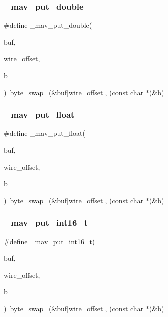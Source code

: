 \mbox{\label{protocol_8h_ab99f10b1bf768f4122b1caa067d24ba8}} 
\subsubsection{\+\_\+mav\+\_\+put\+\_\+double}
{\footnotesize\ttfamily \#define \+\_\+mav\+\_\+put\+\_\+double(\begin{DoxyParamCaption}\item[{}]{buf,  }\item[{}]{wire\+\_\+offset,  }\item[{}]{b }\end{DoxyParamCaption})~byte\+\_\+swap\+\_(\&buf[wire\+\_\+offset], (const char $\ast$)\&b)}

\mbox{\label{protocol_8h_a7dc7a1d53caa88eafeb412ae3dfe7e48}} 
\subsubsection{\+\_\+mav\+\_\+put\+\_\+float}
{\footnotesize\ttfamily \#define \+\_\+mav\+\_\+put\+\_\+float(\begin{DoxyParamCaption}\item[{}]{buf,  }\item[{}]{wire\+\_\+offset,  }\item[{}]{b }\end{DoxyParamCaption})~byte\+\_\+swap\+\_(\&buf[wire\+\_\+offset], (const char $\ast$)\&b)}

\mbox{\label{protocol_8h_ae1c41175f07ee225c3f535005a46bf9b}} 
\subsubsection{\+\_\+mav\+\_\+put\+\_\+int16\+\_\+t}
{\footnotesize\ttfamily \#define \+\_\+mav\+\_\+put\+\_\+int16\+\_\+t(\begin{DoxyParamCaption}\item[{}]{buf,  }\item[{}]{wire\+\_\+offset,  }\item[{}]{b }\end{DoxyParamCaption})~byte\+\_\+swap\+\_(\&buf[wire\+\_\+offset], (const char $\ast$)\&b)}

